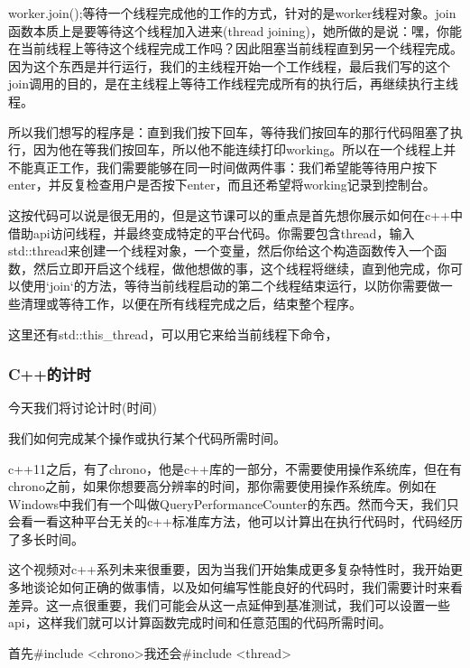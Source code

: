 {\ncodestyle worker.join();}等待一个线程完成他的工作的方式，针对的是{\ncodestyle worker}线程对象。{\ncodestyle join}函数本质上是要等待这个线程加入进来(thread joining)，她所做的是说：嘿，你能在当前线程上等待这个线程完成工作吗？因此阻塞当前线程直到另一个线程完成。因为这个东西是并行运行，我们的主线程开始一个工作线程，最后我们写的这个{\ncodestyle join}调用的目的，是在主线程上等待工作线程完成所有的执行后，再继续执行主线程。

所以我们想写的程序是：直到我们按下回车，等待我们按回车的那行代码阻塞了执行，因为他在等我们按回车，所以他不能连续打印{\ncodestyle working}。所以在一个线程上并不能真正工作，我们需要能够在同一时间做两件事：我们希望能等待用户按下{\ncodestyle enter}，并反复检查用户是否按下{\ncodestyle enter}，而且还希望将{\ncodestyle working}记录到控制台。

这按代码可以说是很无用的，但是这节课可以的重点是首先想你展示如何在c++中借助api访问线程，并最终变成特定的平台代码。你需要包含{\ncodestyle thread}，输入{\ncodestyle std::thread}来创建一个线程对象，一个变量，然后你给这个构造函数传入一个函数，然后立即开启这个线程，做他想做的事，这个线程将继续，直到他完成，你可以使用`join`的方法，等待当前线程启动的第二个线程结束运行，以防你需要做一些清理或等待工作，以便在所有线程完成之后，结束整个程序。

这里还有{std::this_thread}，可以用它来给当前线程下命令，


\subsubsection{C++的计时}

今天我们将讨论计时(时间)

我们如何完成某个操作或执行某个代码所需时间。

c++11之后，有了chrono，他是c++库的一部分，不需要使用操作系统库，但在有chrono之前，如果你想要高分辨率的时间，那你需要使用操作系统库。例如在{\ncodestyle Windows}中我们有一个叫做{\ncodestyle QueryPerformanceCounter}的东西。然而今天，我们只会看一看这种平台无关的c++标准库方法，他可以计算出在执行代码时，代码经历了多长时间。

这个视频对c++系列未来很重要，因为当我们开始集成更多复杂特性时，我开始更多地谈论如何正确的做事情，以及如何编写性能良好的代码时，我们需要计时来看差异。这一点很重要，我们可能会从这一点延伸到基准测试，我们可以设置一些api，这样我们就可以计算函数完成时间和任意范围的代码所需时间。

首先{\ncodestyle \#include <chrono>}我还会{\ncodestyle \#include <thread>}


